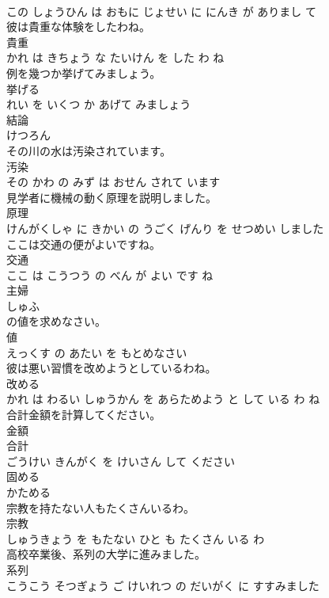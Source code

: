 \documentclass[8pt]{extreport}
\begin{document}
\begin{CJK}{UTF8}{min}
\\	この しょうひん は おもに じょせい に にんき が ありまし て			
\\	彼は貴重な体験をしたわね。	
\\	貴重 
\\	かれ は きちょう な たいけん を した わ ね			
\\	例を幾つか挙げてみましょう。	
\\	挙げる 
\\	れい を いくつ か あげて みましょう			
\\	結論	
\\	けつろん			
\\	その川の水は汚染されています。	
\\	汚染 
\\	その かわ の みず は おせん されて います			
\\	見学者に機械の動く原理を説明しました。	
\\	原理 
\\	けんがくしゃ に きかい の うごく げんり を せつめい しました			
\\	ここは交通の便がよいですね。	
\\	交通 
\\	ここ は こうつう の べん が よい です ね			
\\	主婦	
\\	しゅふ			
\\	の値を求めなさい。	
\\	値 
\\	えっくす の あたい を もとめなさい			
\\	彼は悪い習慣を改めようとしているわね。	
\\	改める 
\\	かれ は わるい しゅうかん を あらためよう と して いる わ ね			
\\	合計金額を計算してください。	
\\	金額 
\\	合計 
\\	ごうけい きんがく を けいさん して ください			
\\	固める	
\\	かためる			
\\	宗教を持たない人もたくさんいるわ。	
\\	宗教 
\\	しゅうきょう を もたない ひと も たくさん いる わ			
\\	高校卒業後、系列の大学に進みました。	
\\	系列 
\\	こうこう そつぎょう ご けいれつ の だいがく に すすみました			

\end{CJK}
\end{document}
